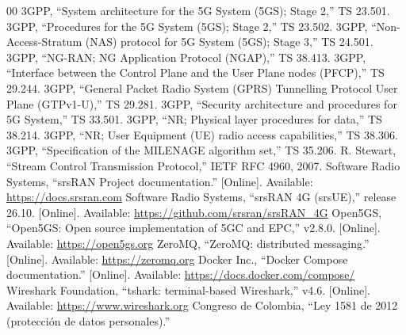 \documentclass[conference]{IEEEtran}
\begin{document}
\begin{thebibliography}{00}
 3GPP, ``System architecture for the 5G System (5GS); Stage 2,'' TS 23.501.
 3GPP, ``Procedures for the 5G System (5GS); Stage 2,'' TS 23.502.
 3GPP, ``Non-Access-Stratum (NAS) protocol for 5G System (5GS); Stage 3,'' TS 24.501.
 3GPP, ``NG-RAN; NG Application Protocol (NGAP),'' TS 38.413.
 3GPP, ``Interface between the Control Plane and the User Plane nodes (PFCP),'' TS 29.244.
 3GPP, ``General Packet Radio System (GPRS) Tunnelling Protocol User Plane (GTPv1-U),'' TS 29.281.
 3GPP, ``Security architecture and procedures for 5G System,'' TS 33.501.
 3GPP, ``NR; Physical layer procedures for data,'' TS 38.214.
 3GPP, ``NR; User Equipment (UE) radio access capabilities,'' TS 38.306.
 3GPP, ``Specification of the MILENAGE algorithm set,'' TS 35.206.
 R. Stewart, ``Stream Control Transmission Protocol,'' IETF RFC 4960, 2007.
 Software Radio Systems, ``srsRAN Project documentation.'' [Online]. Available: \url{https://docs.srsran.com}
 Software Radio Systems, ``srsRAN 4G (srsUE),'' release 26.10. [Online]. Available: \url{https://github.com/srsran/srsRAN_4G}
 Open5GS, ``Open5GS: Open source implementation of 5GC and EPC,'' v2.8.0. [Online]. Available: \url{https://open5gs.org}
 ZeroMQ, ``ZeroMQ: distributed messaging.'' [Online]. Available: \url{https://zeromq.org}
 Docker Inc., ``Docker Compose documentation.'' [Online]. Available: \url{https://docs.docker.com/compose/}
 Wireshark Foundation, ``tshark: terminal-based Wireshark,'' v4.6. [Online]. Available: \url{https://www.wireshark.org}
 Congreso de Colombia, ``Ley 1581 de 2012 (protección de datos personales).''
\end{thebibliography}
\end{document}
